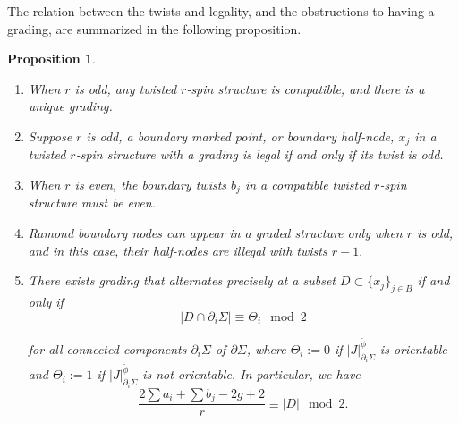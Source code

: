 \documentclass[11pt,a4paper]{article}
\newtheorem{prop}[dummy]{Proposition}
\theoremstyle{definition}
\theoremstyle{remark}
\numberwithin{equation}{section}
\begin{document}
The relation between the twists and legality, and the obstructions to having a grading, are summarized in the following proposition.
\begin{prop}
\label{prop lifting}
\begin{enumerate}
\item\label{it lift odd exist} When $r$ is odd, any twisted $r$-spin structure is compatible, and there is a unique grading.
\item\label{it lift odd legal} Suppose $r$ is odd, a boundary marked point, or boundary half-node, $x_j$ in a twisted $r$-spin structure with a grading is legal if and only if its twist is odd.
\item\label{it lift even compatible} When $r$ is even, the boundary twists $b_j$ in a compatible twisted $r$-spin structure must be even.  



\item\label{it Ramond boundary node}
Ramond boundary nodes can appear in a graded structure only when $r$ is odd, and in this case, their half-nodes are illegal with twists $r-1.$
\item\label{it lift compatible parity}
There exists grading that alternates precisely at a subset $D \subset \{x_j\}_{j \in B}$ if and only if
\begin{equation}\label{eq boundarywise pairty}
    |D\cap \partial_i \Sigma| \equiv  \Theta_i \mod 2
\end{equation}

for all connected components $\partial_i \Sigma$ of $\partial \Sigma$, where $\Theta_i:=0$ if $|J|^{\tilde\phi}_{\partial_i\Sigma}$ is orientable and $\Theta_i:=1$ if $|J|^{\tilde\phi}_{\partial_i\Sigma}$ is not orientable.
In particular, we have
\begin{equation}\label{eq pairty all genus}
   \frac{2\sum a_i + \sum b_j-2g + 2}{r} \equiv |D| \mod 2.
\end{equation}

\end{enumerate}
\end{prop}
\end{document}
